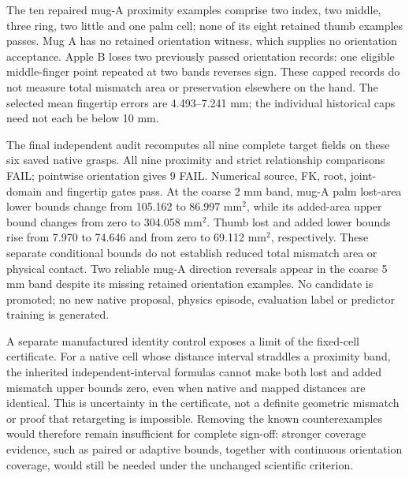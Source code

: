 The ten repaired mug-A proximity examples comprise two index, two middle,
three ring, two little and one palm cell; none of its eight retained thumb
examples passes. Mug A has no retained orientation witness, which supplies no
orientation acceptance. Apple B loses two previously passed orientation
records: one eligible middle-finger point repeated at two bands reverses sign.
These capped records do not measure total mismatch area or preservation
elsewhere on the hand. The selected mean fingertip errors are 4.493--7.241 mm;
the individual historical caps need not each be below 10 mm.

The final independent audit recomputes all nine complete target fields on
these six saved native grasps. All nine proximity and strict relationship
comparisons FAIL; pointwise orientation gives 9 FAIL. Numerical source,
FK, root, joint-domain and fingertip gates pass. At the coarse 2 mm band,
mug-A palm lost-area lower bounds change from 105.162 to 86.997 mm$^2$, while
its added-area upper bound changes from zero to 304.058 mm$^2$. Thumb lost
and added lower bounds rise from 7.970 to 74.646 and from zero to 69.112
mm$^2$, respectively. These separate conditional bounds do not establish
reduced total mismatch area or physical contact. Two reliable mug-A direction
reversals appear in the coarse 5 mm band despite its missing retained
orientation examples. No candidate is promoted; no new native proposal,
physics episode, evaluation label or predictor training is generated.

A separate manufactured identity control exposes a limit of the fixed-cell
certificate. For a native cell whose distance interval straddles a proximity
band, the inherited independent-interval formulas cannot make both lost and
added mismatch upper bounds zero, even when native and mapped distances are
identical. This is uncertainty in the certificate, not a definite geometric
mismatch or proof that retargeting is impossible. Removing the known
counterexamples would therefore remain insufficient for complete sign-off:
stronger coverage evidence, such as paired or adaptive bounds, together with
continuous orientation coverage, would still be needed under the unchanged scientific criterion.

